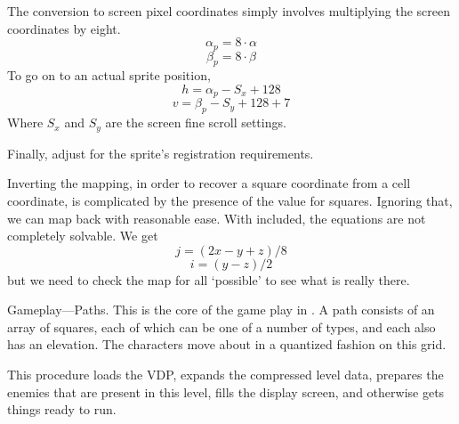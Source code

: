 The conversion to screen pixel coordinates simply involves multiplying the
screen coordinates by eight. $$\alpha_p=8\cdot\alpha$$ $$\beta_p=8\cdot\beta$$
To go on to an actual sprite position,  $$h=\alpha_p-S_x+128$$
$$v=\beta_p-S_y+128+7$$
Where $S_x$ and $S_y$ are the screen fine scroll settings.

Finally, adjust for the sprite's registration requirements.

Inverting the mapping, in order to recover a square coordinate from a cell
coordinate, is complicated by the presence of the  value for squares.
Ignoring that, we can map back with reasonable ease.
With  included, the
equations are not completely solvable.  We get $$j=(2x-y+z)/8$$
$$i=(y-z)/2$$but
we need to check the map for all `possible'  to see what is really
there.

\fi

Gameplay---Paths.  This is the core of the game play in \TT.  A path
consists of an array of squares, each of which can be one of a number of types,
and each also has an elevation.  The characters move about in a quantized
fashion on this grid.

\fi

This procedure loads the VDP, expands the compressed level data,
prepares the
enemies that are present in this level, fills the display screen, and otherwise
gets things ready to run.

